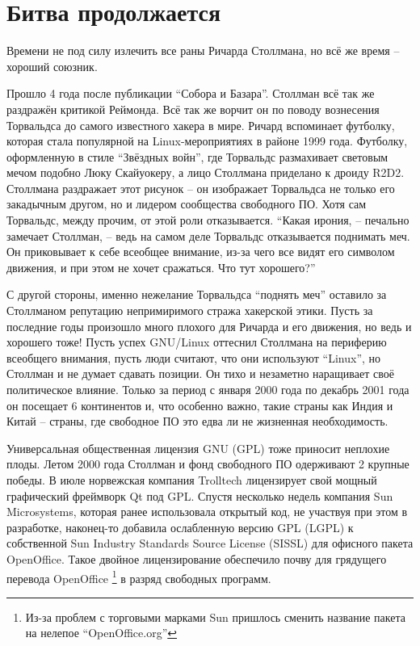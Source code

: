 

\chapter{Битва продолжается}

Времени не под силу излечить все раны Ричарда Столлмана, но всё же время -- хороший союзник.

Прошло 4 года после публикации \enquote{Собора и Базара}. Столлман всё так же раздражён критикой Реймонда. Всё так же ворчит он по поводу вознесения Торвальдса до самого известного хакера в мире. Ричард вспоминает футболку, которая стала популярной на Linux-мероприятиях в районе 1999 года. Футболку, оформленную в стиле \enquote{Звёздных войн}, где Торвальдс размахивает световым мечом подобно Люку Скайуокеру, а лицо Столлмана приделано к дроиду R2D2. Столлмана раздражает этот рисунок -- он изображает Торвальдса не только его закадычным другом, но и лидером сообщества свободного ПО. Хотя сам Торвальдс, между прочим, от этой роли отказывается. \enquote{Какая ирония, -- печально замечает Столлман, -- ведь на самом деле Торвальдс отказывается поднимать меч. Он приковывает к себе всеобщее внимание, из-за чего все видят его символом движения, и при этом не хочет сражаться. Что тут хорошего?}

С другой стороны, именно нежелание Торвальдса \enquote{поднять меч} оставило за Столлманом репутацию непримиримого стража хакерской этики. Пусть за последние годы произошло много плохого для Ричарда и его движения, но ведь и хорошего тоже! Пусть успех GNU/Linux оттеснил Столлмана на периферию всеобщего внимания, пусть люди считают, что они используют \enquote{Linux}, но Столлман и не думает сдавать позиции. Он тихо и незаметно наращивает своё политическое влияние. Только за период с января 2000 года по декабрь 2001 года он посещает 6 континентов и, что особенно важно, такие страны как Индия и Китай -- страны, где свободное ПО это едва ли не жизненная необходимость.

Универсальная общественная лицензия GNU (GPL) тоже приносит неплохие плоды. Летом 2000 года Столлман и фонд свободного ПО одерживают 2 крупные победы. В июле норвежская компания Trolltech лицензирует свой мощный графический фреймворк Qt под GPL. Спустя несколько недель компания Sun Microsystems, которая ранее использовала открытый код, не участвуя при этом в разработке, наконец-то добавила ослабленную версию GPL (LGPL) к собственной Sun Industry Standards Source License (SISSL) для офисного пакета OpenOffice. Такое двойное лицензирование обеспечило почву для грядущего перевода OpenOffice \footnote{Из-за проблем с торговыми марками Sun пришлось сменить название пакета на нелепое \enquote{OpenOffice.org}} в разряд свободных программ.

